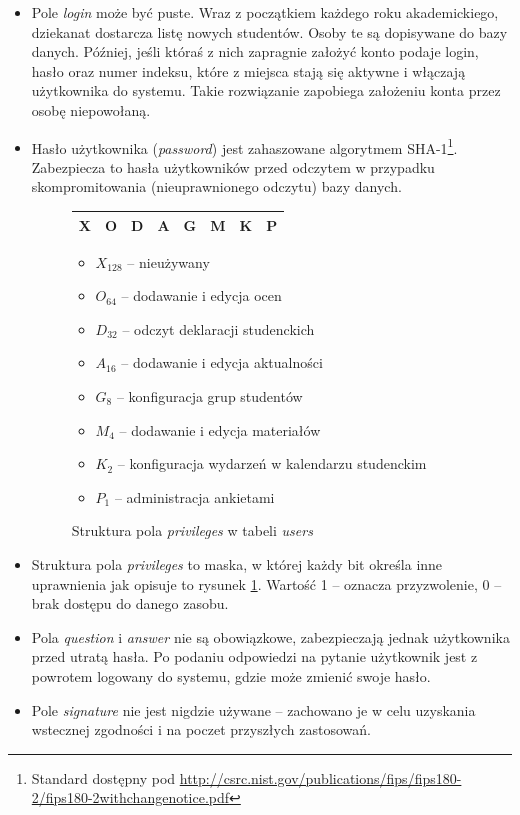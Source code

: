 \documentclass[a4paper,12pt,oneside]{report}
\begin{document}
\begin{itemize}
  \item Pole \emph{login} może być puste. Wraz z początkiem każdego roku akademickiego, dziekanat dostarcza listę nowych studentów. Osoby te są dopisywane do bazy danych. Później, jeśli któraś z nich zapragnie założyć konto podaje login, hasło oraz numer indeksu, które z miejsca stają się aktywne i włączają użytkownika do systemu. Takie rozwiązanie zapobiega założeniu konta przez osobę niepowołaną.
  \item Hasło użytkownika (\emph{password}) jest zahaszowane algorytmem SHA-1\footnote{Standard dostępny pod \url{http://csrc.nist.gov/publications/fips/fips180-2/fips180-2withchangenotice.pdf}}. Zabezpiecza to hasła użytkowników przed odczytem w przypadku skompromitowania (nieuprawnionego odczytu) bazy danych.
\begin{figure}[h]
  \centering
  \begin{tabular}{|c|c|c|c|c|c|c|c|}\hline
    X & O & D & A & G & M & K & P \\\hline
  \end{tabular}
  \begin{itemize}
    \item $X_{128}$ -- nieużywany
    \item $O_{64}$ -- dodawanie i edycja ocen
    \item $D_{32}$ -- odczyt deklaracji studenckich
    \item $A_{16}$ -- dodawanie i edycja aktualności
    \item $G_8$ -- konfiguracja grup studentów
    \item $M_4$ -- dodawanie i edycja materiałów
    \item $K_2$ -- konfiguracja wydarzeń w kalendarzu studenckim
    \item $P_1$ -- administracja ankietami
  \end{itemize}
  \caption{Struktura pola \emph{privileges} w tabeli \emph{users}\label{fig:privileges}}
\end{figure}
  \item Struktura pola \emph{privileges} to maska, w której każdy bit określa inne uprawnienia jak opisuje to rysunek \ref{fig:privileges}. Wartość 1 -- oznacza przyzwolenie, 0 -- brak dostępu do danego zasobu.
  \item Pola \emph{question} i \emph{answer} nie są obowiązkowe, zabezpieczają jednak użytkownika przed utratą hasła. Po podaniu odpowiedzi na pytanie użytkownik jest z powrotem logowany do systemu, gdzie może zmienić swoje hasło.
  \item Pole \emph{signature} nie jest nigdzie używane -- zachowano je w celu uzyskania wstecznej zgodności i na poczet przyszłych zastosowań.
\end{itemize}
\end{document}
